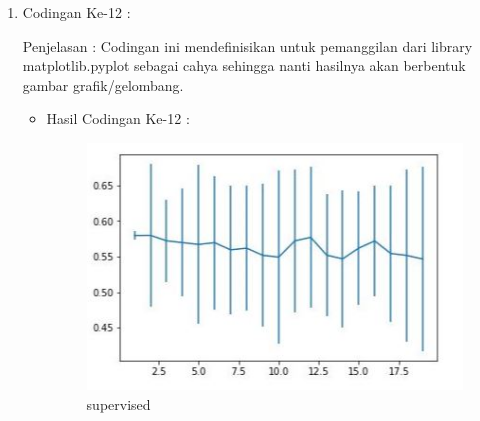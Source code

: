 \begin{enumerate}
\begin{enumerate}
\begin{itemize}
\end{itemize}
\par
\item Codingan Ke-12 :
\par Penjelasan : Codingan ini mendefinisikan untuk pemanggilan dari library matplotlib.pyplot sebagai cahya sehingga nanti hasilnya akan berbentuk gambar grafik/gelombang.
\par 
\begin{itemize}
\par
\item Hasil Codingan Ke-12 :

\begin{figure}[ht]
\centering
\includegraphics[scale=0.4]{figures/hasil12.jpg}
\caption{supervised}
\label{contoh}
\end{figure}

\end{itemize}
\end{enumerate}
\end{enumerate}

